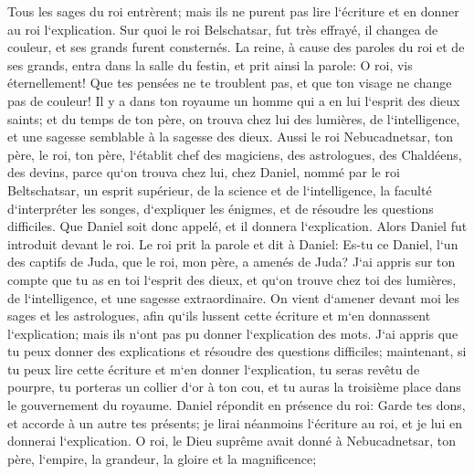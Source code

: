 \verse Tous les sages du roi entrèrent; mais ils ne purent pas lire l`écriture et en donner au roi l`explication. 
\verse Sur quoi le roi Belschatsar, fut très effrayé, il changea de couleur, et ses grands furent consternés. 
\verse La reine, à cause des paroles du roi et de ses grands, entra dans la salle du festin, et prit ainsi la parole: O roi, vis éternellement! Que tes pensées ne te troublent pas, et que ton visage ne change pas de couleur! 
\verse Il y a dans ton royaume un homme qui a en lui l`esprit des dieux saints; et du temps de ton père, on trouva chez lui des lumières, de l`intelligence, et une sagesse semblable à la sagesse des dieux. Aussi le roi Nebucadnetsar, ton père, le roi, ton père, l`établit chef des magiciens, des astrologues, des Chaldéens, des devins, 
\verse parce qu`on trouva chez lui, chez Daniel, nommé par le roi Beltschatsar, un esprit supérieur, de la science et de l`intelligence, la faculté d`interpréter les songes, d`expliquer les énigmes, et de résoudre les questions difficiles. Que Daniel soit donc appelé, et il donnera l`explication. 
\verse Alors Daniel fut introduit devant le roi. Le roi prit la parole et dit à Daniel: Es-tu ce Daniel, l`un des captifs de Juda, que le roi, mon père, a amenés de Juda? 
\verse J`ai appris sur ton compte que tu as en toi l`esprit des dieux, et qu`on trouve chez toi des lumières, de l`intelligence, et une sagesse extraordinaire. 
\verse On vient d`amener devant moi les sages et les astrologues, afin qu`ils lussent cette écriture et m`en donnassent l`explication; mais ils n`ont pas pu donner l`explication des mots. 
\verse J`ai appris que tu peux donner des explications et résoudre des questions difficiles; maintenant, si tu peux lire cette écriture et m`en donner l`explication, tu seras revêtu de pourpre, tu porteras un collier d`or à ton cou, et tu auras la troisième place dans le gouvernement du royaume. 
\verse Daniel répondit en présence du roi: Garde tes dons, et accorde à un autre tes présents; je lirai néanmoins l`écriture au roi, et je lui en donnerai l`explication. 
\verse O roi, le Dieu suprême avait donné à Nebucadnetsar, ton père, l`empire, la grandeur, la gloire et la magnificence; 
